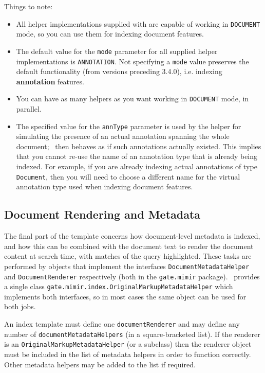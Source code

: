 Things to note:
\begin{itemize}
  \item All helper implementations supplied with \Mimir{} are capable of working
  in {\tt DOCUMENT} mode, so you can use them for indexing document features.
  \item The default value for the {\tt mode} parameter for all supplied helper
  implementations is {\tt ANNOTATION}. Not specifying a {\tt mode} value
  preserves the default functionality (from versions preceding 3.4.0), i.e.
  indexing {\bf annotation} features.
  \item You can have as many helpers as you want working in {\tt DOCUMENT}
  mode, in parallel.
  \item The specified value for the {\tt annType} parameter is used by the
  helper for simulating the presence of an actual annotation spanning the whole
  document; \Mimir\ then behaves as if such annotations actually existed. This
  implies that you cannot re-use the name of an annotation type that is already
  being indexed. For example, if you are already indexing actual annotations of
  type {\tt Document}, then you will need to choose a different name for the
  virtual annotation type used when indexing document features.
\end{itemize}

\subsection*{Document Rendering and Metadata}

The final part of the template concerns how document-level metadata is indexed,
and how this can be combined with the document text to render the document
content at search time, with matches of the query highlighted.  These tasks are
performed by objects that implement the interfaces
\lstinline!DocumentMetadataHelper! and \lstinline!DocumentRenderer!
respectively (both in the \lstinline!gate.mimir! package). \Mimir\ provides a
single class \lstinline!gate.mimir.index.OriginalMarkupMetadataHelper!
which implements both interfaces, so in most cases the same object can be used
for both jobs.

An index template must define one \lstinline!documentRenderer! and may define
any number of \lstinline!documentMetadataHelpers! (in a square-bracketed list).
If the renderer is an \lstinline!OriginalMarkupMetadataHelper! (or a subclass)
then the renderer object must be included in the list of metadata helpers in
order to function correctly.  Other metadata helpers may be added to the list
if required.

